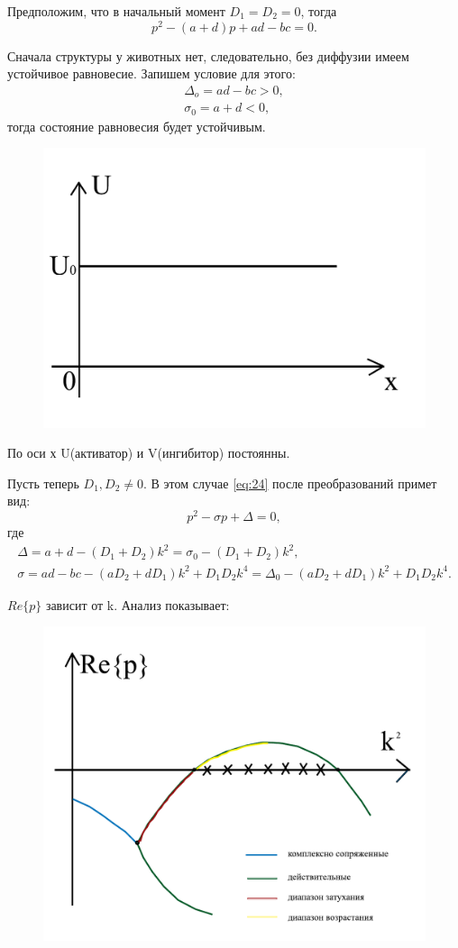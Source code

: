 Предположим, что в начальный момент $D_1=D_2=0$, тогда
\begin{equation}
	p^2-(a+d)p+ad-bc=0.
	\label{eq:24}
\end{equation}

Сначала структуры у животных нет, следовательно, без диффузии имеем устойчивое равновесие. Запишем условие для этого:
\begin{gather*}
	\Delta_o=ad-bc>0, \\ \sigma_0=a+d<0,
\end{gather*}
тогда состояние равновесия будет устойчивым. 

\begin{figure}[H]
	\centering
	\includegraphics[width=0.5\linewidth]{fig/fig8.pdf}   
\end{figure}

По оси х U(активатор) и V(ингибитор) постоянны. 

Пусть теперь $D_1, D_2 \neq 0$. В этом случае \eqref{eq:24} после преобразований примет вид:
\begin{equation*}
	p^2-\sigma p+\Delta=0,
\end{equation*}
где
\begin{gather*}
	\Delta=a+d-(D_1+D_2)k^2=\sigma_0-(D_1+D_2)k^2, \\ \sigma=ad-bc-(aD_2+dD_1)k^2+D_1D_2k^4=\Delta_0-(aD_2+dD_1)k^2+D_1D_2k^4.
\end{gather*}

$Re\{p\}$ зависит от k. Анализ показывает:
\begin{figure}[H]
	\centering
	\includegraphics[width=0.5\linewidth]{fig/fig9.pdf}   
\end{figure}

